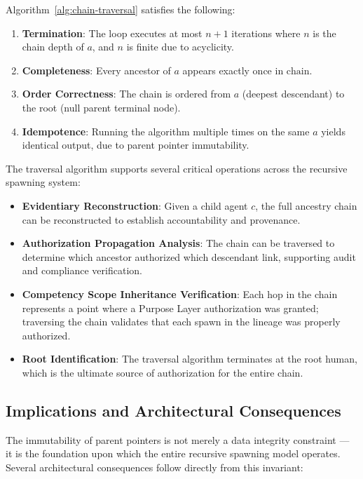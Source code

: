 \begin{property}
\label{prop:traversal-correctness}
Algorithm~\ref{alg:chain-traversal} satisfies the following:
\begin{enumerate}
\item \textbf{Termination}: The loop executes at most $n+1$ iterations where $n$ is the chain depth of $a$, and $n$ is finite due to acyclicity.
\item \textbf{Completeness}: Every ancestor of $a$ appears exactly once in $\text{chain}$.
\item \textbf{Order Correctness}: The chain is ordered from $a$ (deepest descendant) to the root (null parent terminal node).
\item \textbf{Idempotence}: Running the algorithm multiple times on the same $a$ yields identical output, due to parent pointer immutability.
\end{enumerate}
\end{property}

The traversal algorithm supports several critical operations across the recursive spawning system:

\begin{itemize}
\item \textbf{Evidentiary Reconstruction}: Given a child agent $c$, the full ancestry chain can be reconstructed to establish accountability and provenance.
\item \textbf{Authorization Propagation Analysis}: The chain can be traversed to determine which ancestor authorized which descendant link, supporting audit and compliance verification.
\item \textbf{Competency Scope Inheritance Verification}: Each hop in the chain represents a point where a Purpose Layer authorization was granted; traversing the chain validates that each spawn in the lineage was properly authorized.
\item \textbf{Root Identification}: The traversal algorithm terminates at the root human, which is the ultimate source of authorization for the entire chain.
\end{itemize}

\subsection{Implications and Architectural Consequences}
\label{sec:implications}

The immutability of parent pointers is not merely a data integrity constraint — it is the foundation upon which the entire recursive spawning model operates. Several architectural consequences follow directly from this invariant:

